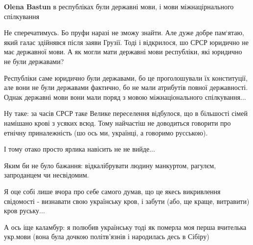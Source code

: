 \begin{itemize}
\begin{itemize}
 
\textbf{Olena Bastun} в республіках були державні мови, і мови міжнацірнального спілкування

 

Не сперечатимусь. Бо пруфи наразі не зможу знайти. Але дуже добре пам‘ятаю,
який галас здійнявся після заяви Грузії. Тоді і відкрилося, шо СРСР юридично не
має державної мови. А як могли мати державні мови республіки, які юридично не
були державами?


 

Республіки саме юридично були державами, бо це проголошували їх конституції,
але вони не були державами фактично, бо не мали атрибутів повної державності.
Однак державні мови вони мали поряд з мовою міжнаціонального спілкування...
\end{itemize}


Ну таке: за часів СРСР таке Велике переселення відбулося, що в більшості сімей
намішано крові з усяких всюд. Тому найчастіш не доводиться говорити про етнічну
приналежність (шо ось ми, українці, а говоримо русською).

І тому отако просто ярлика навісить не не вийде...

Яким би не було бажання: відкалібрувати людину манкуртом, рагулєм, запроданцем
чи несвідомим.

Я оце собі лише вчора про себе самого думав, що це якесь викривлення свідомості
- визнавати свою українську кров, і забути (або, ще краще, витравити) кров
руську...

А ось іще каламбур: я полюбив українську тоді як померла моя перша вчителька
укр.мови (вона була дочкою політв'язнів і народилась десь в Сібіру)


\end{itemize}
